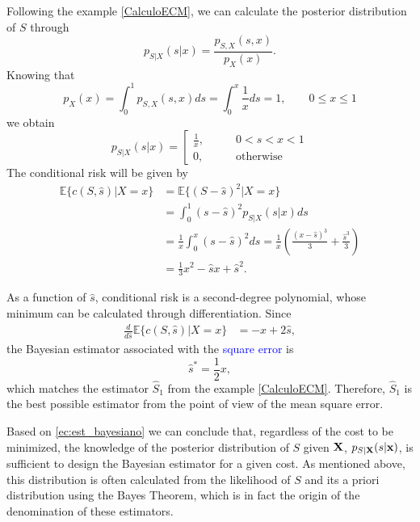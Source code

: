 \begin{example}
\label{CalculoECM2}
Following the example \ref{CalculoECM}, we can calculate the posterior distribution of $S$ through
\begin{equation}
p_{S|X}(s|x) = \frac{p_{S,X}(s,x)}{p_X(x)}. 
\end{equation}
Knowing that
\begin{equation}
p_{X}(x) = \int_0^1 p_{S,X}(s,x) ds = \int_0^x \frac{1}{x} ds = 1,   \qquad 0\le x\le 1
\end{equation}
we obtain
\begin{equation}
p_{S|X}(s|x) = \left[
\begin{array}{ll}
\frac{1}{x}, & \qquad 0<s<x<1 \\
0,           & \qquad \text{otherwise}
\end{array}
\right.
\end{equation}
The conditional risk will be given by
\begin{align}
\mathbb{E}\{c(S,\hat s)|X=x\} 
   &= \mathbb{E}\{(S-\hat s)^2|X=x\} \nonumber\\
   &= \int_0^1 (s-\hat{s})^2 p_{S|X}(s|x) ds   \nonumber\\
   &= \frac{1}{x} \int_0^x (s-\hat{s})^2 ds  
    = \frac{1}{x} \left(\frac{(x-\hat{s})^3}{3} + \frac{\hat{s}^3}{3} \right)    \nonumber\\
   &= \frac{1}{3}x^2 - \hat{s} x + \hat{s}^2. 
\label{Est:ECMsx}
\end{align}

As a function of $\hat{s}$, conditional risk is a second-degree polynomial, whose minimum can be calculated through differentiation. Since
\begin{align}
\frac{d}{d\hat{s}} \mathbb{E}\{c(S,\hat s)|X=x\} 
   &= - x + 2 \hat{s} ,
\end{align}
the Bayesian estimator associated with the \textcolor{blue}{square error} is
\begin{equation}
\label{eq:sopt_halfx}
\hat{s}^* = \frac{1}{2}x,
\end{equation}
which matches the estimator $\hat{S}_1$ from the example \ref{CalculoECM}. Therefore, $\hat{S}_1$ is the best possible estimator from the point of view of the mean square error.
\end{example}\vspace{0.4cm}

Based on \eqref{ec:est_bayesiano} we can conclude that, regardless of the cost to be minimized, the knowledge of the posterior distribution of $S$ given ${\bf X}$, $p_{S|{\bf X}}(s|{\bf x})$, is sufficient to design the Bayesian estimator for a given cost. As mentioned above, this distribution is often calculated from the likelihood of $S$ and its a priori distribution using the Bayes Theorem, which is in fact the origin of the denomination of these estimators.

